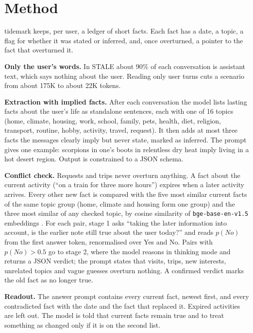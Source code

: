 \documentclass[10pt,twocolumn]{article}
\begin{document}
\section{Method}

tidemark keeps, per user, a ledger of short facts. Each fact has a date, a topic, a flag for whether it was stated or
inferred, and, once overturned, a pointer to the fact that overturned it.

\textbf{Only the user's words.} In STALE about 90\% of each conversation is assistant text, which says nothing about
the user. Reading only user turns cuts a scenario from about 175K to about 22K tokens.

\textbf{Extraction with implied facts.} After each conversation the model lists lasting facts about the user's life
as standalone sentences, each with one of 16 topics (home, climate, housing, work, school, family, pets, health, diet,
religion, transport, routine, hobby, activity, travel, request). It then adds at most three facts the messages clearly
imply but never state, marked as inferred. The prompt gives one example: scorpions in one's boots in relentless dry
heat imply living in a hot desert region. Output is constrained to a JSON schema.

\textbf{Conflict check.} Requests and trips never overturn anything. A fact about the current activity (``on a train
for three more hours'') expires when a later activity arrives. Every other new fact is compared with the five most
similar current facts of the same topic group (home, climate and housing form one group) and the three most similar
of any checked topic, by cosine similarity of \texttt{bge-base-en-v1.5} embeddings \cite{bge}. For each pair, stage 1
asks ``taking the later information into account, is the earlier note still true about the user today?'' and reads
$p(\textit{No})$ from the first answer token, renormalised over Yes and No. Pairs with $p(\textit{No})>0.5$ go to stage
2, where the model reasons in thinking mode and returns a JSON verdict; the prompt states that visits, trips, new
interests, unrelated topics and vague guesses overturn nothing. A confirmed verdict marks the old fact as no longer
true.

\textbf{Readout.} The answer prompt contains every current fact, newest first, and every contradicted fact with the
date and the fact that replaced it. Expired activities are left out. The model is told that current facts remain true
and to treat something as changed only if it is on the second list.
\end{document}
